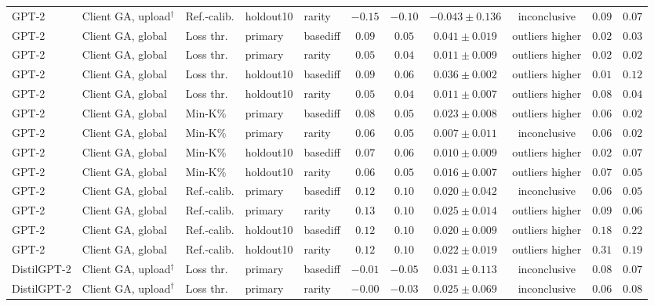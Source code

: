 \begin{table}[t]
\begin{tabular*}{\textwidth}{@{\extracolsep{\fill}}lllllcccccc@{}}
GPT-2 & Client GA, upload$^{\dagger}$ & Ref.-calib. & holdout10 & rarity & $-0.15$ & $-0.10$ & $-0.043 \pm 0.136$ & inconclusive & $0.09$ & $0.07$ \\
GPT-2 & Client GA, global & Loss thr. & primary & basediff & $0.09$ & $0.05$ & $0.041 \pm 0.019$ & outliers higher & $0.02$ & $0.03$ \\
GPT-2 & Client GA, global & Loss thr. & primary & rarity & $0.05$ & $0.04$ & $0.011 \pm 0.009$ & outliers higher & $0.02$ & $0.02$ \\
GPT-2 & Client GA, global & Loss thr. & holdout10 & basediff & $0.09$ & $0.06$ & $0.036 \pm 0.002$ & outliers higher & $0.01$ & $0.12$ \\
GPT-2 & Client GA, global & Loss thr. & holdout10 & rarity & $0.05$ & $0.04$ & $0.011 \pm 0.007$ & outliers higher & $0.08$ & $0.04$ \\
GPT-2 & Client GA, global & Min-K\% & primary & basediff & $0.08$ & $0.05$ & $0.023 \pm 0.008$ & outliers higher & $0.06$ & $0.02$ \\
GPT-2 & Client GA, global & Min-K\% & primary & rarity & $0.06$ & $0.05$ & $0.007 \pm 0.011$ & inconclusive & $0.06$ & $0.02$ \\
GPT-2 & Client GA, global & Min-K\% & holdout10 & basediff & $0.07$ & $0.06$ & $0.010 \pm 0.009$ & outliers higher & $0.02$ & $0.07$ \\
GPT-2 & Client GA, global & Min-K\% & holdout10 & rarity & $0.06$ & $0.05$ & $0.016 \pm 0.007$ & outliers higher & $0.07$ & $0.05$ \\
GPT-2 & Client GA, global & Ref.-calib. & primary & basediff & $0.12$ & $0.10$ & $0.020 \pm 0.042$ & inconclusive & $0.06$ & $0.05$ \\
GPT-2 & Client GA, global & Ref.-calib. & primary & rarity & $0.13$ & $0.10$ & $0.025 \pm 0.014$ & outliers higher & $0.09$ & $0.06$ \\
GPT-2 & Client GA, global & Ref.-calib. & holdout10 & basediff & $0.12$ & $0.10$ & $0.020 \pm 0.009$ & outliers higher & $0.18$ & $0.22$ \\
GPT-2 & Client GA, global & Ref.-calib. & holdout10 & rarity & $0.12$ & $0.10$ & $0.022 \pm 0.019$ & outliers higher & $0.31$ & $0.19$ \\
DistilGPT-2 & Client GA, upload$^{\dagger}$ & Loss thr. & primary & basediff & $-0.01$ & $-0.05$ & $0.031 \pm 0.113$ & inconclusive & $0.08$ & $0.07$ \\
DistilGPT-2 & Client GA, upload$^{\dagger}$ & Loss thr. & primary & rarity & $-0.00$ & $-0.03$ & $0.025 \pm 0.069$ & inconclusive & $0.06$ & $0.08$ \\

\end{tabular*}
\end{table}
